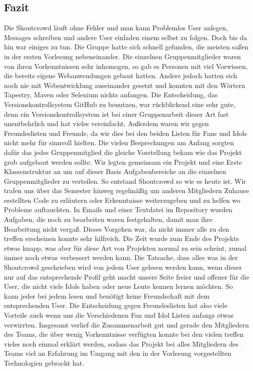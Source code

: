 \subsection{Fazit}
Die Shoutcrowd läuft ohne Fehler und man kann Problemlos User anlegen, Messages schreiben und andere User einladen einem selbst zu folgen. Doch bis da hin war einiges zu tun.
Die Gruppe hatte sich schnell gefunden, die meisten saßen in der ersten Vorlesung nebeneinander.
Die einzelnen Gruppenmitglieder waren von ihren Vorkenntnissen sehr inhomogen, so gab es Personen mit viel Vorwissen, die bereits eigene Webanwendungen gebaut hatten. Andere jedoch hatten sich noch nie mit Webentwicklung auseinander gesetzt  und konnten mit den Wörtern Tapestry, Maven oder Selenium nichts anfangen.
Die Entscheidung, das Versionskontrollsystem GitHub zu benutzen, war rückblickend eine sehr gute, denn ein Versionskontrollsystem ist bei einer Gruppenarbeit dieser Art fast unentbehrlich und hat vieles vereinfacht.
Außerdem waren wir gegen Freundeslisten und Freunde, da wir dies bei den beiden Listen für Fans und Idols nicht mehr für sinnvoll hielten. Die vielen Besprechungen am Anfang sorgten dafür das jedes Gruppenmitglied die gleiche Vorstellung bekam wie das Projekt grob aufgebaut werden sollte.
Wir legten gemeinsam ein Projekt und eine Erste Klassenstruktur an um auf dieser Basis Aufgabenbereiche an die einzelnen Gruppenmitglieder zu verteilen. So entstand Shoutcrowd so wie es heute ist. 
Wir trafen uns über das Semester hinweg regelmäßig um anderen Mitgliedern Zuhause erstellten Code zu erläutern oder Erkenntnisse weiterzugeben und zu helfen wo Probleme auftauchten. In Emails und einer Textdatei im Repository wurden Aufgaben, die noch zu bearbeiten waren festgehalten, damit man ihre Bearbeitung nicht vergaß. Dieses Vorgehen war, da nicht immer alle zu den treffen erscheinen konnte sehr hilfreich.
Die Zeit wurde zum Ende des Projekts etwas knapp, was aber für diese Art von Projekten normal zu sein scheint, zumal immer noch etwas verbessert werden kann.
Die Tatsache, dass alles was in der Shoutcrowd geschrieben wird von jedem User gelesen werden kann, wenn dieser nur auf das entsprechende Profil geht macht unsere Seite freier und offener für die User, die nicht viele Idols haben oder neue Leute kennen lernen möchten. So kann jeder bei jedem lesen und benötigt keine Freundschaft mit dem entsprechenden User. Die Entscheidung gegen Freundeslisten hat also viele Vorteile auch wenn uns die Verschiedenen Fan und Idol Listen anfangs etwas verwirrten.
Insgesamt verlief die Zusammenarbeit gut und gerade den Mitgliedern des Teams, die über wenig Vorkenntnisse verfügten konnte bei den vielen treffen vieles noch einmal erklärt werden, sodass das Projekt bei alles Mitgliedern des Teams viel an Erfahrung im Umgang mit den in der Vorlesung vorgestellten Technologien gebracht hat.